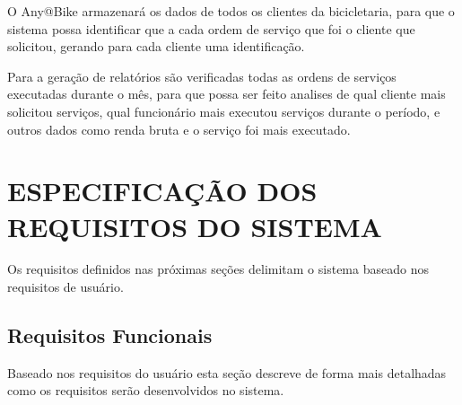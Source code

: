 \documentclass[
	12pt,				%
	openright,
	oneside,			%
	a4paper,			%
	chapter=TITLE,		%
	brazil				%
	]{abntex2}
\begin{document}
O Any@Bike armazenará os dados de todos os clientes da bicicletaria, para que o sistema possa identificar que a cada ordem de serviço que foi o cliente que solicitou, gerando para cada cliente uma identificação. 

Para a geração de relatórios são verificadas todas as ordens de serviços executadas durante o mês, para que possa ser feito analises de qual cliente mais solicitou serviços, qual funcionário mais executou serviços durante o período, e outros dados como renda bruta e  o serviço foi mais executado.  

\newpage
\chapter{ESPECIFICAÇÃO DOS REQUISITOS DO SISTEMA}

Os requisitos definidos nas próximas seções delimitam o sistema baseado nos requisitos de usuário.


\section{Requisitos Funcionais}


Baseado nos requisitos do usuário esta seção descreve de forma mais detalhadas como os requisitos serão desenvolvidos no sistema.
\end{document}
